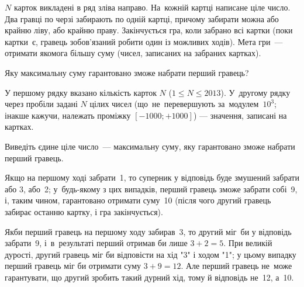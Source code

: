 ﻿$N$ карток викладені в ряд зліва направо. На~кожній картці написане ціле число. Два гравці по черзі забирають по одній картці, причому забирати можна або крайню ліву, або крайню праву. Закінчується гра, коли забрано всі картки (поки картки~є, гравець зобов'язаний робити один із можливих ходів). Мета гри~--- отримати якомога більшу суму (чисел, записаних на забраних картках).

Яку максимальну суму гарантовано зможе набрати перший гравець?


\InputFile

У першому рядку вказано кількість карток $N$ ($1\leqslant N\leqslant 2013$). У~другому рядку через пробіли задані $N$ цілих чисел (що~не~перевершують за~модулем~$10^3$; інакше кажучи, належать проміжку $[-1000; +1000]$) --- значення, записані на картках.


\OutputFile

Виведіть єдине ціле число~--- максимальну суму, яку гарантовано зможе набрати перший гравець.


\Examples

\begin{example}
%
\end{example}


\Note

Якщо на першому ході забрати~1, то суперник у відповідь буде змушений забрати або 3, або~2; у~будь-якому з цих випадків, перший гравець зможе забрати собі~9, і, таким чином, гарантовано отримати суму~10 (після чого другий гравець забирає останню картку, і гра закінчується).

Якби перший гравець на першому ходу забирав~3, то другий міг~би у відповідь забрати~9, і~в~результаті перший отримав би лише $3+2 = 5$. При великій дурості, другий гравець міг би відповісти на хід "3" і ходом "1"; у цьому випадку перший гравець міг би отримати суму $3+9=12$. Але перший гравець не~може гарантувати, що другий зробить такий дурний хід, тому й відповідь не~12, а~10.